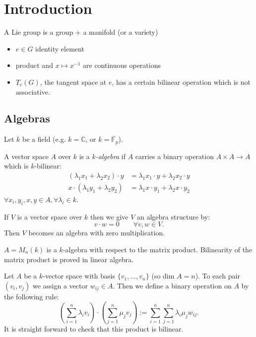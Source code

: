 \section{Introduction}

A Lie group is a group + a manifold (or a variety)
\begin{itemize}
  \item $e \in G$ identity element
  \item product and $x \mapsto x^{-1}$ are continuous operations
  \item $T_e(G)$, the tangent space at $e$, has a certain bilinear operation which is not associative.
\end{itemize}

\subsection{Algebras}

Let $k$ be a field (e.g. $k=\mathbb{C}$, or $k=\overline{\mathbb{F}_p}$).

\begin{definition}
  A vector space $A$ over $k$ is a \emph{$k$-algebra} if $A$ carries a binary operation $A \times A \to A$ which is $k$-bilinear:
  \begin{align*}
    (\lambda_1 x_1 + \lambda_2 x_2) \cdot y &= \lambda_1 x_1 \cdot y + \lambda_2 x_2 \cdot y\\
    x \cdot (\lambda_1 y_1 + \lambda_2 y_2) &= \lambda_1 x \cdot y_1 + \lambda_2 x \cdot  y_2
  \end{align*}
  $\forall x_i, y_i, x, y \in A, \forall \lambda_i \in k$.
\end{definition}

\begin{example}
  If $V$ is a vector space over $k$ then we give $V$ an algebra structure by:
  \[
    v \cdot w = 0 \qquad \forall v,w \in V.
  \]
  Then $V$ becomes an algebra with zero multiplication.
\end{example}

\begin{example}
  $A=M_n(k)$ is a $k$-algebra with respect to the matrix product. Bilinearity of the matrix product is proved in linear algebra.
\end{example}

\begin{remark}
  Let $A$ be a $k$-vector space with basis $\{v_1, \dots, v_n\}$ (so $\text{dim } A = n$). To each pair $(v_i,v_j)$ we assign a vector $w_{ij} \in A$. Then we define a binary operation on $A$ by the following rule:
  \[
    \left( \sum_{i=1}^n \lambda_i v_i \right) \cdot \left( \sum_{j=1}^n \mu_j v_j \right) := \sum_{i=1}^n \sum_{j=1}^n \lambda_i \mu_j w_{ij}.
  \]
  It is straight forward to check that this product is bilinear.
\end{remark}

